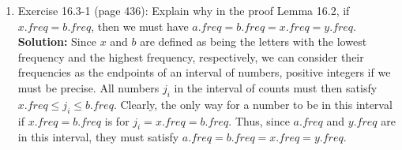 \documentclass[11pts]{article}
\begin{document}
\begin{enumerate}
\newpage
\item Exercise 16.3-1 (page 436): Explain why in the proof Lemma 16.2, if
$x.freq = b.freq$, then we must have
$a.freq = b.freq = x.freq = y.freq$. \\

  \textbf{Solution:} Since $x$ and $b$ are defined as being the letters with
  the lowest frequency and the highest frequency, respectively, we can consider
  their frequencies as the endpoints of an interval of numbers,
  positive integers if we
  must be precise. All numbers $j_i$ in the interval of counts must then
  satisfy $x.freq \le j_i \le b.freq $. Clearly, the only way for a number to
  be in this interval if $x.freq = b.freq$ is for $j_i = x.freq = b.freq$.
  Thus, since $a.freq$ and $y.freq$ are in this interval, they must satisfy
  $a.freq = b.freq = x.freq = y.freq$. \\

\end{enumerate}
\end{document}
